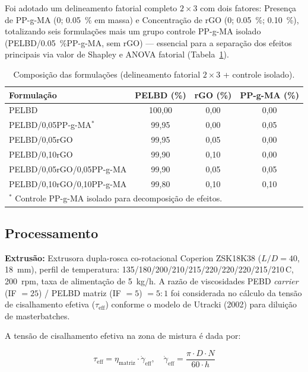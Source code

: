 \documentclass[12pt,a4paper,twoside]{article}
\begin{document}
Foi adotado um delineamento fatorial completo $2\times3$ com dois fatores: Presença de PP-g-MA (0; \SI{0,05}{\percent} em massa) e Concentração de rGO (0; \SI{0,05}{\percent}; \SI{0,10}{\percent}), totalizando seis formulações mais um grupo controle PP-g-MA isolado (PELBD/\SI{0,05}{\percent}PP-g-MA, sem rGO) — essencial para a separação dos efeitos principais via valor de Shapley e ANOVA fatorial (Tabela~\ref{tab:formulacoes}).

\begin{table}[H]
\centering
\caption{Composição das formulações (delineamento fatorial $2\times3$ + controle isolado).}
\label{tab:formulacoes}
\begin{tabular}{lccc}
\toprule
\textbf{Formulação} & \textbf{PELBD (\%)} & \textbf{rGO (\%)} & \textbf{PP-g-MA (\%)} \\
\midrule
PELBD                      & 100,00 & 0,00 & 0,00 \\
PELBD/0,05PP-g-MA$^*$      & 99,95  & 0,00 & 0,05 \\
PELBD/0,05rGO              & 99,95  & 0,05 & 0,00 \\
PELBD/0,10rGO              & 99,90  & 0,10 & 0,00 \\
PELBD/0,05rGO/0,05PP-g-MA  & 99,90  & 0,05 & 0,05 \\
PELBD/0,10rGO/0,10PP-g-MA  & 99,80  & 0,10 & 0,10 \\
\bottomrule
\multicolumn{4}{l}{\footnotesize $^*$ Controle PP-g-MA isolado para decomposição de efeitos.}
\end{tabular}
\end{table}

\subsection{Processamento}

\textbf{Extrusão:} Extrusora dupla-rosca co-rotacional Coperion ZSK18K38 ($L/D = 40$, \SI{18}{mm}), perfil de temperatura: 135/180/200/210/215/220/220/220/215/210\,\textdegree C, \SI{200}{rpm}, taxa de alimentação de \SI{5}{kg/h}. A razão de viscosidades PEBD \textit{carrier} (IF $=25$) / PELBD matriz (IF $=5$) $= 5:1$ foi considerada no cálculo da tensão de cisalhamento efetiva ($\tau_{\text{eff}}$) conforme o modelo de Utracki (2002) para diluição de masterbatches.

A tensão de cisalhamento efetiva na zona de mistura é dada por:

\begin{equation}
\tau_{\text{eff}} = \eta_{\text{matriz}} \cdot \dot{\gamma}_{\text{eff}}, \quad \dot{\gamma}_{\text{eff}} = \frac{\pi \cdot D \cdot N}{60 \cdot h}
\label{eq:shear_stress}
\end{equation}
\end{document}
